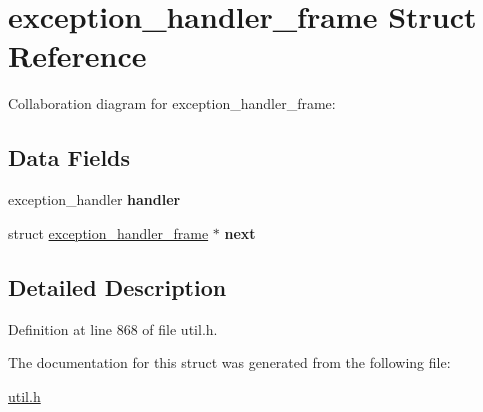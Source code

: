 \hypertarget{structexception__handler__frame}{}\section{exception\+\_\+handler\+\_\+frame Struct Reference}
\label{structexception__handler__frame}


Collaboration diagram for exception\+\_\+handler\+\_\+frame\+:
\subsection*{Data Fields}
\begin{DoxyCompactItemize}
\item 
\mbox{\label{structexception__handler__frame_a9df815cc8cec8aace242043b89fb44e8}} 
exception\+\_\+handler {\bfseries handler}
\item 
\mbox{\label{structexception__handler__frame_a407cf31d00d01b49b1774dea464c29cf}} 
struct \hyperlink{structexception__handler__frame}{exception\+\_\+handler\+\_\+frame} $\ast$ {\bfseries next}
\end{DoxyCompactItemize}


\subsection{Detailed Description}


Definition at line 868 of file util.\+h.



The documentation for this struct was generated from the following file\+:\begin{DoxyCompactItemize}
\item 
\hyperlink{util_8h}{util.\+h}\end{DoxyCompactItemize}
